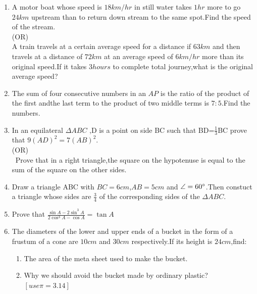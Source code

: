 \documentclass{article}
\begin{document}
\begin{enumerate}
	\item A motor boat whose speed is $18 km/hr$ in still water takes $1hr$ more to go $24km$ upstream than to return down stream to the same spot.Find the speed of the stream.\\
		(OR)\\
		A train travels at a certain average speed for a distance if $63km$ and then travels at a distance of $72km$ at an average speed of $6km/hr$ more than its original speed.If it takes $3hours$ to complete total journey,what is the original average speed?
	\item The sum of four consecutive numbers in an $AP$ is the ratio of the product of the first andthe last term to the product of two middle terms is $7:5$.Find the numbers.
	\item In an equilateral $\Delta ABC$ ,D is a point on side BC such that BD=$\frac{1}{3}$BC prove that $9(AD)^2=7(AB)^2$.\\
		(OR)\\
	\ Prove that in a right triangle,the square on the hypotenuse is equal to the sum of the square on the other sides.
		\item Draw a triangle ABC with $BC=6cm$,$AB=5cm$ and $\angle=60\degree$.Then constuct a triangle whose sides are $\frac{3}{4}$ of the corresponding sides of the $\Delta ABC$.
\item Prove that $\frac{\sin A - 2\sin^3 A}{2\cos^3 A - \cos A} = \tan A$

	\item The diameters of the lower and upper ends of a bucket in the form of a frustum of a cone are $10cm$ and $30cm$ respectively.If its height is $24cm$,find:
                \begin{enumerate}[label=\roman*)]
                        \item The area of the meta sheet used to make the bucket.
                        \item Why we should avoid the bucket made by ordinary plastic? $[use\pi=3.14]$
		\end{enumerate}


\end{enumerate}
\end{document}
